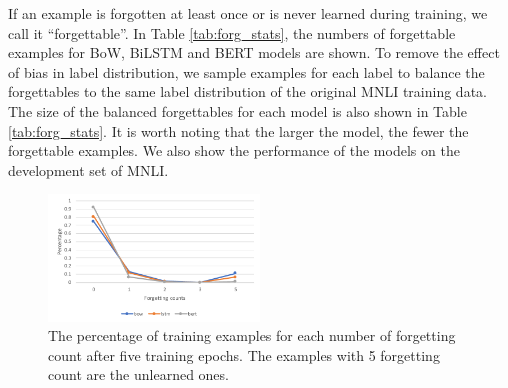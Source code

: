 If an example is forgotten at least once or is never learned during training, we call it ``forgettable''. %
In Table \ref{tab:forg_stats}, the numbers of forgettable examples for BoW, BiLSTM and BERT models are shown. 
To remove the effect of bias in label distribution, we sample examples for each label to balance the forgettables to the same label distribution of the original MNLI training data. The size of the balanced forgettables for each model is also shown in Table \ref{tab:forg_stats}.
It is worth noting that the larger the model, the fewer the forgettable examples. We also show the performance of the models on the development set of MNLI.

\begin{figure}[h]
\centering
  \includegraphics[width=0.5\textwidth]{figures/model2numforgcount_seed0}
  \caption{The percentage of training examples for each number of forgetting count after five training epochs. 
  The examples with 5 forgetting count
  are the unlearned ones.}
  \label{fig:trainingsize-unsup}
\end{figure}

